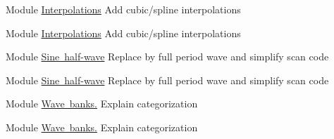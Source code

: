
\begin{DoxyRefList}
\item[Module \mbox{\hyperlink{group__utils__float__math_amgrp4f6557801e0d72940d342939119826d0}{Interpolations}} ]\label{todo__todo000003}%
%
Add cubic/spline interpolations


\item[Module \mbox{\hyperlink{group__utils__float__math_amgrp4f6557801e0d72940d342939119826d0}{Interpolations}} ]\label{todo__todo000003}%
%
Add cubic/spline interpolations


\item[Module \mbox{\hyperlink{group__fx__api_amgrp5c23d81a9378c4ff2e4abd3f6a8099c4}{Sine half-\/wave}} ]\label{todo__todo000001}%
%
Replace by full period wave and simplify scan code


\item[Module \mbox{\hyperlink{group__fx__api_amgrp5c23d81a9378c4ff2e4abd3f6a8099c4}{Sine half-\/wave}} ]\label{todo__todo000001}%
%
Replace by full period wave and simplify scan code


\item[Module \mbox{\hyperlink{group__osc__api_amgrp4774bb87612135e5656df9287e489562}{Wave banks.}} ]\label{todo__todo000002}%
%
Explain categorization 
\item[Module \mbox{\hyperlink{group__osc__api_amgrp4774bb87612135e5656df9287e489562}{Wave banks.}} ]\label{todo__todo000002}%
%
Explain categorization
\end{DoxyRefList}